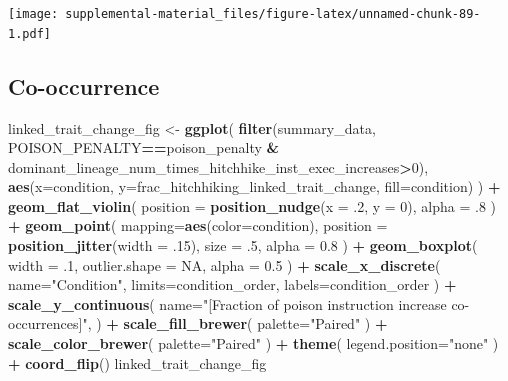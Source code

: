 \documentclass[]{book}
\newenvironment{Shaded}{\begin{snugshade}}{\end{snugshade}}
\newcommand{\DataTypeTok}[1]{\textcolor[rgb]{0.13,0.29,0.53}{#1}}
\newcommand{\DecValTok}[1]{\textcolor[rgb]{0.00,0.00,0.81}{#1}}
\newcommand{\FloatTok}[1]{\textcolor[rgb]{0.00,0.00,0.81}{#1}}
\newcommand{\KeywordTok}[1]{\textcolor[rgb]{0.13,0.29,0.53}{\textbf{#1}}}
\newcommand{\NormalTok}[1]{#1}
\newcommand{\OperatorTok}[1]{\textcolor[rgb]{0.81,0.36,0.00}{\textbf{#1}}}
\newcommand{\OtherTok}[1]{\textcolor[rgb]{0.56,0.35,0.01}{#1}}
\newcommand{\StringTok}[1]{\textcolor[rgb]{0.31,0.60,0.02}{#1}}
\begin{document}
\texttt{[image: supplemental-material\_files/figure-latex/unnamed-chunk-89-1.pdf]}

\hypertarget{co-occurrence}{%
\subsection{Co-occurrence}\label{co-occurrence}}

\begin{Shaded}
\begin{Highlighting}[]
\NormalTok{linked_trait_change_fig <-}\StringTok{ }\KeywordTok{ggplot}\NormalTok{(}
    \KeywordTok{filter}\NormalTok{(summary_data, POISON_PENALTY}\OperatorTok{==}\NormalTok{poison_penalty }\OperatorTok{&}\StringTok{ }\NormalTok{dominant_lineage_num_times_hitchhike_inst_exec_increases}\OperatorTok{>}\DecValTok{0}\NormalTok{),}
    \KeywordTok{aes}\NormalTok{(}\DataTypeTok{x=}\NormalTok{condition, }\DataTypeTok{y=}\NormalTok{frac_hitchhiking_linked_trait_change, }\DataTypeTok{fill=}\NormalTok{condition)}
\NormalTok{  ) }\OperatorTok{+}
\StringTok{  }\KeywordTok{geom_flat_violin}\NormalTok{(}
    \DataTypeTok{position =} \KeywordTok{position_nudge}\NormalTok{(}\DataTypeTok{x =} \FloatTok{.2}\NormalTok{, }\DataTypeTok{y =} \DecValTok{0}\NormalTok{),}
    \DataTypeTok{alpha =} \FloatTok{.8}
\NormalTok{  ) }\OperatorTok{+}
\StringTok{  }\KeywordTok{geom_point}\NormalTok{(}
    \DataTypeTok{mapping=}\KeywordTok{aes}\NormalTok{(}\DataTypeTok{color=}\NormalTok{condition),}
    \DataTypeTok{position =} \KeywordTok{position_jitter}\NormalTok{(}\DataTypeTok{width =} \FloatTok{.15}\NormalTok{),}
    \DataTypeTok{size =} \FloatTok{.5}\NormalTok{,}
    \DataTypeTok{alpha =} \FloatTok{0.8}
\NormalTok{  ) }\OperatorTok{+}
\StringTok{  }\KeywordTok{geom_boxplot}\NormalTok{(}
    \DataTypeTok{width =} \FloatTok{.1}\NormalTok{,}
    \DataTypeTok{outlier.shape =} \OtherTok{NA}\NormalTok{,}
    \DataTypeTok{alpha =} \FloatTok{0.5}
\NormalTok{  ) }\OperatorTok{+}
\StringTok{  }\KeywordTok{scale_x_discrete}\NormalTok{(}
    \DataTypeTok{name=}\StringTok{"Condition"}\NormalTok{,}
    \DataTypeTok{limits=}\NormalTok{condition_order,}
    \DataTypeTok{labels=}\NormalTok{condition_order}
\NormalTok{  ) }\OperatorTok{+}
\StringTok{  }\KeywordTok{scale_y_continuous}\NormalTok{(}
    \DataTypeTok{name=}\StringTok{"[Fraction of poison instruction increase co-occurrences]"}\NormalTok{,}
\NormalTok{  ) }\OperatorTok{+}
\StringTok{  }\KeywordTok{scale_fill_brewer}\NormalTok{(}
    \DataTypeTok{palette=}\StringTok{"Paired"}
\NormalTok{  ) }\OperatorTok{+}
\StringTok{  }\KeywordTok{scale_color_brewer}\NormalTok{(}
    \DataTypeTok{palette=}\StringTok{"Paired"}
\NormalTok{  ) }\OperatorTok{+}
\StringTok{  }\KeywordTok{theme}\NormalTok{(}
    \DataTypeTok{legend.position=}\StringTok{"none"}
\NormalTok{  ) }\OperatorTok{+}
\StringTok{  }\KeywordTok{coord_flip}\NormalTok{()}
\NormalTok{linked_trait_change_fig}
\end{Highlighting}
\end{Shaded}
\end{document}
